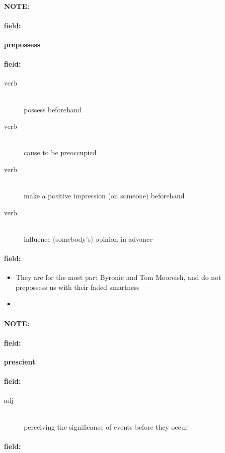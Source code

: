 \documentclass[12pt]{article}
\newenvironment{note}{\paragraph{NOTE:}}{}
\newenvironment{field}{\paragraph{field:}}{}
\begin{document}
\begin{note}
\begin{field}
\textbf{\large prepossess}
\end{field}


\begin{field}
\begin{description}
\item[verb] \hfill \\ 
possess beforehand

\item[verb] \hfill \\ 
cause to be preoccupied

\item[verb] \hfill \\ 
make a positive impression (on someone) beforehand

\item[verb] \hfill \\ 
influence (somebody's) opinion in advance

\end{description}
\end{field}

\begin{field}
\begin{itemize}
\item They are for the most part Byronic and Tom Mooreish, and do not prepossess us with their faded smartness
\item 
\end{itemize}
\end{field}
\end{note}
\begin{note}
\begin{field}
\textbf{\large prescient}
\end{field}


\begin{field}
\begin{description}
\item[adj] \hfill \\ 
perceiving the significance of events before they occur

\end{description}
\end{field}

\begin{field}
\end{field}
\end{note}
\end{document}
